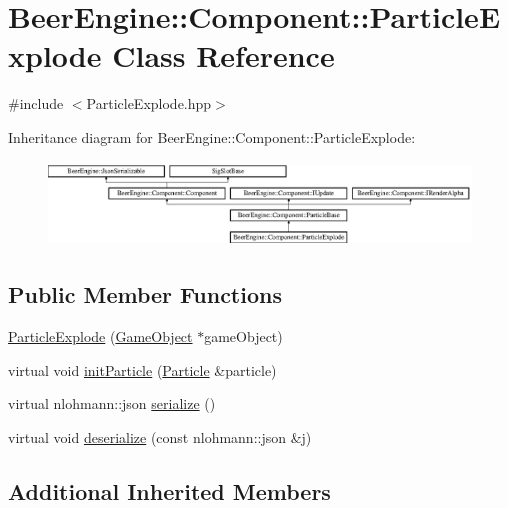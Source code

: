 \hypertarget{class_beer_engine_1_1_component_1_1_particle_explode}{}\section{Beer\+Engine\+:\+:Component\+:\+:Particle\+Explode Class Reference}
\label{class_beer_engine_1_1_component_1_1_particle_explode}


{\ttfamily \#include $<$Particle\+Explode.\+hpp$>$}

Inheritance diagram for Beer\+Engine\+:\+:Component\+:\+:Particle\+Explode\+:\begin{figure}[H]
\begin{center}
\leavevmode
\includegraphics[height=2.248996cm]{class_beer_engine_1_1_component_1_1_particle_explode}
\end{center}
\end{figure}
\subsection*{Public Member Functions}
\begin{DoxyCompactItemize}
\item 
\mbox{\hyperlink{class_beer_engine_1_1_component_1_1_particle_explode_a4e2e2cda3419ea1cab71a61c6e13abad}{Particle\+Explode}} (\mbox{\hyperlink{class_beer_engine_1_1_game_object}{Game\+Object}} $\ast$game\+Object)
\item 
virtual void \mbox{\hyperlink{class_beer_engine_1_1_component_1_1_particle_explode_abe727afab3c6a77d2b163e2c37a0f37b}{init\+Particle}} (\mbox{\hyperlink{struct_beer_engine_1_1_component_1_1_particle}{Particle}} \&particle)
\item 
virtual nlohmann\+::json \mbox{\hyperlink{class_beer_engine_1_1_component_1_1_particle_explode_a194d098568efe69f8e8b62eec5863ae6}{serialize}} ()
\item 
virtual void \mbox{\hyperlink{class_beer_engine_1_1_component_1_1_particle_explode_ad79e74129dd1cd7f20e0575a9ffdffc3}{deserialize}} (const nlohmann\+::json \&j)
\end{DoxyCompactItemize}
\subsection*{Additional Inherited Members}


